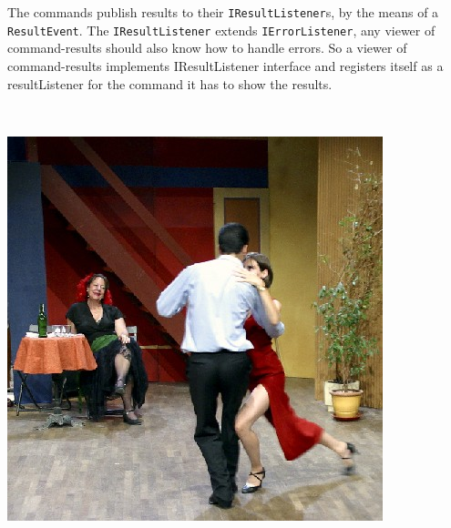 The commands publish results to their \texttt{IResultListener}s, by
the means of a \texttt{ResultEvent}. The \texttt{IResultListener}
extends \texttt{IErrorListener}, any viewer of command-results
should also know how to handle errors. So a viewer of command-results
implements IResultListener interface and registers itself as a resultListener
for the command it has to show the results.
\begin{lyxcode}
~

\end{lyxcode}
\begin{center}
\label{TwoRicardo}\includegraphics[scale=4]{dance/0046-reduc}
\par\end{center}
